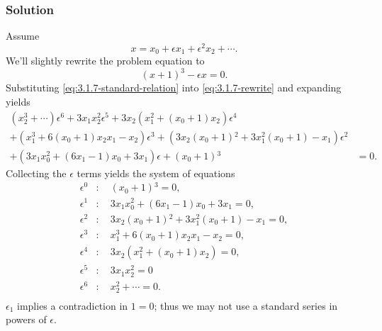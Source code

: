 \documentclass[12pt]{article}
\begin{document}
\subsubsection*{Solution}
Assume
\begin{equation}
  \label{eq:3.1.7-standard-relation}
  x=x_0+\epsilon x_1 + \epsilon^2x_2+\cdots.
\end{equation}
We'll slightly rewrite the problem equation to
\begin{equation}
  \label{eq:3.1.7-rewrite}
  {(x+1)}^3-\epsilon x=0.
\end{equation}
Substituting \cref{eq:3.1.7-standard-relation} into \cref{eq:3.1.7-rewrite} and expanding
yields
\begin{equation*}
  \label{eq:3.1.7-bad-eq}
  \begin{split}
    (x_2^3+\cdots) \epsilon ^6+3 x_1 x_2^2 \epsilon ^5+3 x_2 \left(x_1^2+\left(x_0+1\right)
      x_2\right) \epsilon ^4 \\
    +\left(x_1^3+6 \left(x_0+1\right) x_2 x_1-x_2\right) \epsilon ^3
    +\left(3 x_2 \left(x_0+1\right){}^2+3 x_1^2 \left(x_0+1\right)-x_1\right)
    \epsilon ^2 \\
    +\left(3 x_1 x_0^2+\left(6 x_1-1\right) x_0+3 x_1\right)
    \epsilon +\left(x_0+1\right){}^3&=0.
  \end{split}
\end{equation*}
Collecting the $\epsilon$ terms yields the system of equations
\begin{align*}
  \label{eq:3.1.7-bad-system}
  \epsilon^0 &:\quad \left(x_0+1\right){}^3=0, \\
  \epsilon^1 &:\quad 3 x_1 x_0^2+\left(6 x_1-1\right) x_0+3 x_1=0, \\
  \epsilon^2 &:\quad 3 x_2 \left(x_0+1\right){}^2+3 x_1^2 \left(x_0+1\right)-x_1=0, \\
  \epsilon^3 &:\quad x_1^3+6 \left(x_0+1\right) x_2 x_1-x_2=0, \\
  \epsilon^4 &:\quad 3 x_2 \left(x_1^2+\left(x_0+1\right) x_2\right)=0, \\
  \epsilon^5 &:\quad 3 x_1 x_2^2=0 \\
  \epsilon^6 &:\quad x_2^2+\cdots = 0. \\
\end{align*}
$\epsilon_1$ implies a contradiction in $1=0$; thus we may not use a standard
series in powers of $\epsilon$.
\end{document}
